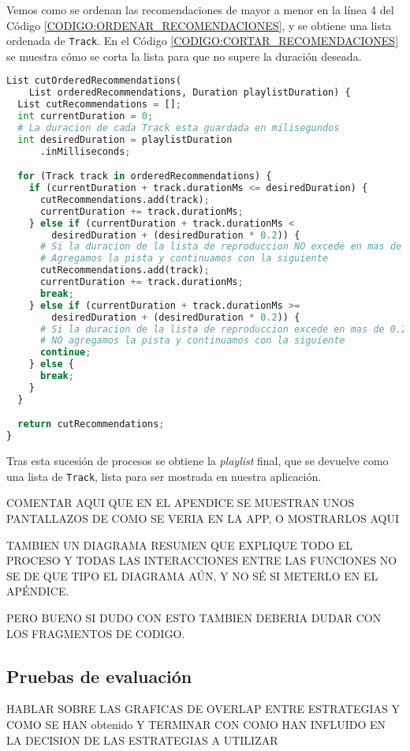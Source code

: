 Vemos como se ordenan las recomendaciones de mayor a menor en la línea 4 del Código \ref{CODIGO:ORDENAR_RECOMENDACIONES},
y se obtiene una lista ordenada de \texttt{Track}. En el Código \ref{CODIGO:CORTAR_RECOMENDACIONES} se muestra cómo se corta
la lista para que no supere la duración deseada.

\begin{lstlisting}[language=python, caption=Cortar recomendaciones, label=CODIGO:CORTAR_RECOMENDACIONES]
List cutOrderedRecommendations(
    List orderedRecommendations, Duration playlistDuration) {
  List cutRecommendations = [];
  int currentDuration = 0;
  # La duracion de cada Track esta guardada en milisegundos
  int desiredDuration = playlistDuration
      .inMilliseconds; 

  for (Track track in orderedRecommendations) {
    if (currentDuration + track.durationMs <= desiredDuration) {
      cutRecommendations.add(track);
      currentDuration += track.durationMs;
    } else if (currentDuration + track.durationMs <
        desiredDuration + (desiredDuration * 0.2)) {
      # Si la duracion de la lista de reproduccion NO excede en mas de 0.2 la duracion deseada
      # Agregamos la pista y continuamos con la siguiente
      cutRecommendations.add(track);
      currentDuration += track.durationMs;
      break;
    } else if (currentDuration + track.durationMs >=
        desiredDuration + (desiredDuration * 0.2)) {
      # Si la duracion de la lista de reproduccion excede en mas de 0.2 la duracion deseada
      # NO agregamos la pista y continuamos con la siguiente
      continue;
    } else {
      break;
    }
  }

  return cutRecommendations;
}
\end{lstlisting}

Tras esta sucesión de procesos se obtiene la \textit{playlist} final, que se devuelve como una lista de \texttt{Track},
lista para ser mostrada en nuestra aplicación.

COMENTAR AQUI QUE EN EL APENDICE SE MUESTRAN UNOS PANTALLAZOS DE COMO SE VERIA EN LA APP, O MOSTRARLOS AQUI

TAMBIEN UN DIAGRAMA RESUMEN QUE EXPLIQUE TODO EL PROCESO Y TODAS LAS INTERACCIONES ENTRE LAS FUNCIONES 
NO SE DE QUE TIPO EL DIAGRAMA AÚN, Y NO SÉ SI METERLO EN EL APÉNDICE.

PERO BUENO SI DUDO CON ESTO TAMBIEN DEBERIA DUDAR CON LOS FRAGMENTOS DE CODIGO.








\subsection{Pruebas de evaluación\label{SEC:PRUEBAS_EVALUACION}}

HABLAR SOBRE LAS GRAFICAS DE OVERLAP ENTRE ESTRATEGIAS Y COMO SE HAN obtenido
Y TERMINAR CON COMO HAN INFLUIDO EN LA DECISION DE LAS ESTRATEGIAS A UTILIZAR
